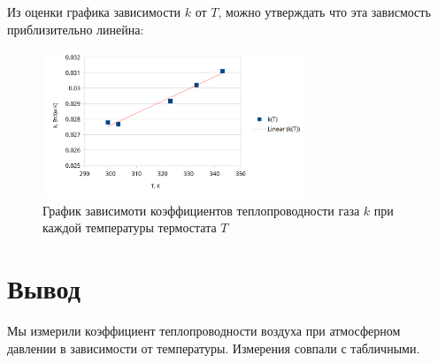 \documentclass[a4paper]{article}
\begin{document}
\newpage

Из оценки графика зависимости $k$ от $T$, можно утверждать что эта зависмость приблизительно линейна:

 \begin{figure}[ht]
    \centering
    \includegraphics[width=0.7\textwidth]{k_T/chart_k_T.png}
    \caption{График зависимоти коэффициентов теплопроводности
газа $k$ при каждой температуры термостата $T$}
\end{figure}

\section{Вывод}

Мы измерили коэффициент теплопроводности воздуха при атмосферном
давлении в зависимости от температуры. Измерения совпали с табличными.
\end{document}
